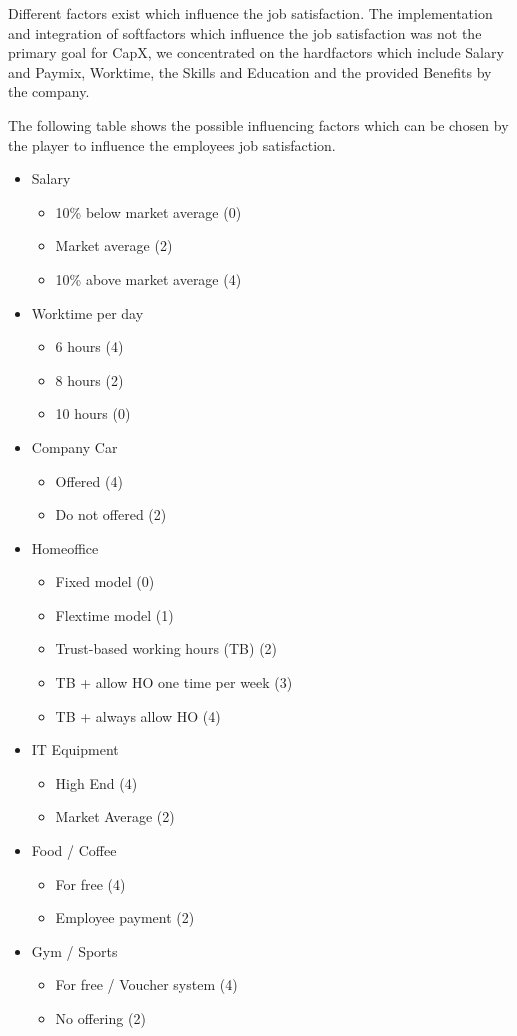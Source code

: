 Different factors exist which influence the job satisfaction. \cite{Kapur} The implementation and integration of softfactors which influence the job satisfaction was not the primary goal for CapX, we concentrated on the hardfactors which include Salary and Paymix, Worktime, the Skills and Education and the provided Benefits by the company. 

The following table shows the possible influencing factors which can be chosen by the player to influence the employees job satisfaction.
\begin{itemize}
    \item Salary
    \begin{itemize}
        \item 10\% below market average (0)
        \item Market average (2)
        \item 10\% above market average (4)
    \end{itemize}
    \item Worktime per day
    \begin{itemize}
        \item 6 hours (4)
        \item 8 hours (2)
        \item 10 hours (0)
    \end{itemize}
    \item Company Car
    \begin{itemize}
        \item Offered (4)
        \item Do not offered (2)
    \end{itemize}
    \item Homeoffice
    \begin{itemize}
        \item Fixed model (0)
        \item Flextime model (1)
        \item Trust-based working hours (TB) (2)
        \item TB + allow HO one time per week (3)
        \item TB + always allow HO (4)
    \end{itemize}
    \item IT Equipment
    \begin{itemize}
        \item High End (4)
        \item Market Average (2)
    \end{itemize}
    \item Food / Coffee
    \begin{itemize}
        \item For free (4)
        \item Employee payment (2)
    \end{itemize}
    \item Gym / Sports
    \begin{itemize}
        \item For free / Voucher system (4)
        \item No offering (2)
    \end{itemize}
\end{itemize}

